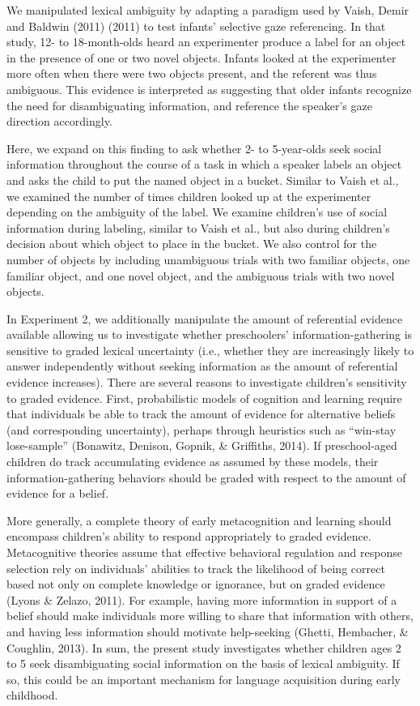 \documentclass[english,man]{apa6}
\theoremstyle{definition}
\theoremstyle{definition}
\theoremstyle{definition}
\theoremstyle{remark}
\begin{document}
We manipulated lexical ambiguity by adapting a paradigm used by Vaish,
Demir and Baldwin (2011) (2011) to test infants' selective gaze
referencing. In that study, 12- to 18-month-olds heard an experimenter
produce a label for an object in the presence of one or two novel
objects. Infants looked at the experimenter more often when there were
two objects present, and the referent was thus ambiguous. This evidence
is interpreted as suggesting that older infants recognize the need for
disambiguating information, and reference the speaker's gaze direction
accordingly.

Here, we expand on this finding to ask whether 2- to 5-year-olds seek
social information throughout the course of a task in which a speaker
labels an object and asks the child to put the named object in a bucket.
Similar to Vaish et al., we examined the number of times children looked
up at the experimenter depending on the ambiguity of the label. We
examine children's use of social information during labeling, similar to
Vaish et al., but also during children's decision about which object to
place in the bucket. We also control for the number of objects by
including unambiguous trials with two familiar objects, one familiar
object, and one novel object, and the ambiguous trials with two novel
objects.

In Experiment 2, we additionally manipulate the amount of referential
evidence available allowing us to investigate whether preschoolers'
information-gathering is sensitive to graded lexical uncertainty (i.e.,
whether they are increasingly likely to answer independently without
seeking information as the amount of referential evidence increases).
There are several reasons to investigate children's sensitivity to
graded evidence. First, probabilistic models of cognition and learning
require that individuals be able to track the amount of evidence for
alternative beliefs (and corresponding uncertainty), perhaps through
heuristics such as \enquote{win-stay lose-sample} (Bonawitz, Denison,
Gopnik, \& Griffiths, 2014). If preschool-aged children do track
accumulating evidence as assumed by these models, their
information-gathering behaviors should be graded with respect to the
amount of evidence for a belief.

More generally, a complete theory of early metacognition and learning
should encompass children's ability to respond appropriately to graded
evidence. Metacognitive theories assume that effective behavioral
regulation and response selection rely on individuals' abilities to
track the likelihood of being correct based not only on complete
knowledge or ignorance, but on graded evidence (Lyons \& Zelazo, 2011).
For example, having more information in support of a belief should make
individuals more willing to share that information with others, and
having less information should motivate help-seeking (Ghetti, Hembacher,
\& Coughlin, 2013). In sum, the present study investigates whether
children ages 2 to 5 seek disambiguating social information on the basis
of lexical ambiguity. If so, this could be an important mechanism for
language acquisition during early childhood.
\end{document}
